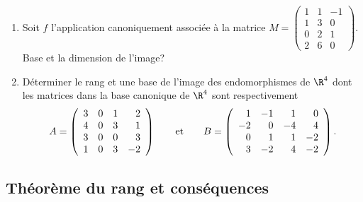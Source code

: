 \documentclass[a4paper, 11pt]{article}
\begin{document}
\setlength\fboxrule{1pt}
\hspace{-0.5cm} 
\setlength\fboxrule{0.5pt}

{\footnotesize \begin{exercice}
\begin{enumerate}
\item Soit $f$ l'application canoniquement associ\'ee \`a la matrice $M=\left(\begin{array}{rrr} 1&1&-1\\1&3&0\\0&2&1\\2&6&0  \end{array}\right)$. Base et la dimension de l'image?
\item D\'eterminer le rang et une base de l'image des endomorphismes de $\R^4$ dont les matrices dans la base canonique de $\R^4$ sont respectivement
$$A=\left(\begin{array}{rrrr} 3&0&1&2\\4&0&3&1\\3&0&0&3\\1&0&3&-2   \end{array}\right)\qquad \hbox{et}\qquad B=\left(\begin{array}{rrrr} 1&-1&1&0\\-2&0&-4&4\\0&1&1&-2\\3&-2&4&-2   \end{array}\right).$$
\end{enumerate}
\end{exercice}
}

\subsection{Th\'eor\`{e}me du rang et cons\'equences}
\end{document}
